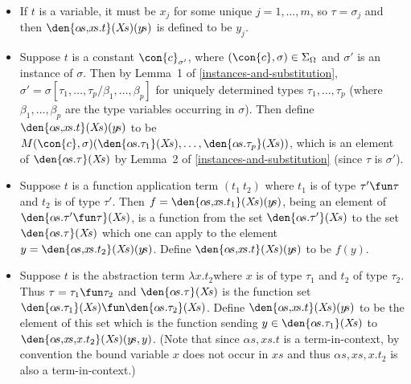 \begin{itemize}
 
\item 
If $t$ is a variable, it must be $x_{j}$ for some unique 
$j=1,\ldots,m$, so $\tau=\sigma_{j}$ and then
$\den{\alpha\!s,\!x\!s.t}(X\!s)(y\!s)$ is defined to be $y_{j}$.
 
\item 
Suppose $t$ is a constant $\con{c}_{\sigma'}$, where
$(\con{c},\sigma)\in\Sigma_{\Omega}$ and $\sigma'$ is an instance of
$\sigma$.  Then by Lemma~1 of \ref{instances-and-substitution},
$\sigma'=\sigma[\tau_{1},\ldots,\tau_{p}/\beta_{1},\ldots,\beta_{p}]$
for uniquely determined types $\tau_{1},\ldots,\tau_{p}$ (where
$\beta_{1},\ldots,\beta_{p}$ are the type variables occurring in
$\sigma$). Then define $\den{\alpha\!s,\!x\!s.t}(X\!s)(y\!s)$ to be
$M(\con{c},\sigma)(\den{\alpha\!s.\tau_{1}}(X\!s),
\ldots,\den{\alpha\!s.\tau_{p}}(X\!s))$,
which is an element of $\den{\alpha\!s.\tau}(X\!s)$ by Lemma~2 of
\ref{instances-and-substitution} (since $\tau$ is $\sigma'$).

\item 
Suppose $t$ is a function application term $(t_{1}\
t_{2})$ where $t_{1}$ is of type
$\tau'\fun\tau$ and $t_{2}$ is of type $\tau'$. Then
$f=\den{\alpha\!s,\!x\!s.t_{1}}(X\!s)(y\!s)$, being an element of
$\den{\alpha\!s.\tau'\fun\tau}(X\!s)$, is a function from the set
$\den{\alpha\!s.\tau'}(X\!s)$ to the set $\den{\alpha\!s.\tau}(X\!s)$
which one can apply to the element
$y=\den{\alpha\!s,\!x\!s.t_{2}}(X\!s)(y\!s)$. Define
$\den{\alpha\!s,\!x\!s.t}(X\!s)(y\!s)$ to be $f(y)$.

\item Suppose $t$ is the abstraction
term $\lambda x.t_{2}$where $x$ is of type $\tau_{1}$ and $t_{2}$ of
type $\tau_{2}$. Thus $\tau=\tau_{1}\fun\tau_{2}$ and
$\den{\alpha\!s.\tau}(X\!s)$ is the function set
$\den{\alpha\!s.\tau_{1}}(X\!s)\fun\den{\alpha\!s.\tau_{2}}(X\!s)$.
Define $\den{\alpha\!s,\!x\!s.t}(X\!s)(y\!s)$ to be the element of
this set which is the function sending
$y\in\den{\alpha\!s.\tau_{1}}(X\!s)$ to
$\den{\alpha\!s,\!x\!s,\!x.t_{2}}(X\!s)(y\!s,y)$. (Note that since
$\alpha\!s,\!x\!s.t$ is a term-in-context, by convention the bound
variable $x$ does not occur in $x\!s$ and thus
$\alpha\!s,\!x\!s,\!x.t_{2}$ is also a term-in-context.)
\end{itemize}
